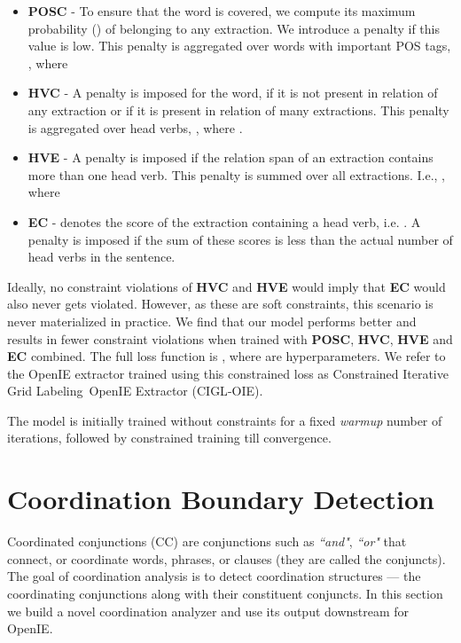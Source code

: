 \documentclass[11pt,a4paper]{article}
\newcommand{\shortname}{{\scshape IGL}}
\newcommand{\longname}{Iterative Grid Labeling}
\begin{document}
\begin{itemize} 
    \item \textbf{POSC} - To ensure that the  word is covered, we compute its maximum probability () of belonging to any extraction. We introduce a penalty if this value is low. This penalty is aggregated over words with important POS tags, , where
    

    \item \textbf{HVC} - A penalty is imposed for the  word, if it is not present in relation of any extraction 
    or if it is present in relation of many extractions.
This penalty is aggregated over head verbs, , where 
    .


    \item \textbf{HVE} - A penalty is imposed if the relation span of an extraction contains more than one head verb. This penalty is summed over all extractions. I.e., , where

\item \textbf{EC} -  denotes the score  of the  extraction containing a head verb, i.e. . A penalty is imposed if the sum of these scores is less than the actual number of head verbs in the sentence. 

\end{itemize}

Ideally, no constraint violations of \textbf{HVC} and \textbf{HVE} would imply that \textbf{EC} would also never gets violated. However, as these are soft constraints, this scenario is never materialized in practice. We find that our model performs better and results in fewer constraint violations when trained with \textbf{POSC}, \textbf{HVC}, \textbf{HVE} and \textbf{EC} combined. The full loss function is , where  are hyperparameters. We refer to the OpenIE extractor trained using this constrained loss as Constrained \longname\ OpenIE Extractor (C\shortname-OIE).

The model is initially trained without constraints for a fixed \textit{warmup} number of iterations, followed by constrained training till convergence. 
\section{Coordination Boundary Detection}
\label{sec:conjunctions}
Coordinated conjunctions (CC) are conjunctions such as \textit{``and"}, \textit{``or"} that connect, or coordinate words, phrases, or clauses (they  are called the conjuncts). The goal of coordination analysis is to detect  coordination structures --- the coordinating conjunctions along with their constituent conjuncts. In this section we build a novel coordination analyzer and use its output downstream for OpenIE.
\end{document}

